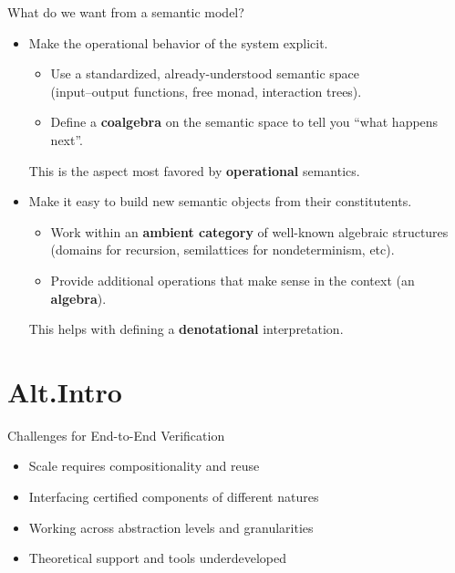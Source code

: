 \documentclass[aspectratio=1610,mathserif]{beamer}
\begin{document}
\begin{frame}{What do we want from a semantic model?} %
  \begin{itemize}
    \item Make the operational behavior of the system explicit.
      \begin{itemize}
        \item Use a standardized, already-understood semantic space \\
          (input--output functions, free monad, interaction trees).
        \item Define a \textbf{coalgebra} on the semantic space
           to tell you ``what happens next''.
      \end{itemize}
      This is the aspect most favored by \textbf{operational} semantics.
    \pause
    \vspace{1ex}
    \item Make it easy to build new semantic objects from their constitutents.
      \begin{itemize}
        \item Work within an \textbf{ambient category} of well-known algebraic structures \\
          (domains for recursion,
           semilattices for nondeterminism, etc).
        \item Provide additional operations that make sense in the context
          (an \textbf{algebra}).
      \end{itemize}
      This helps with defining a \textbf{denotational} interpretation.
  \end{itemize}
\end{frame}


\section{Alt.\@ Intro} %
\frame\sectionpage

\begin{frame}{Challenges for End-to-End Verification}
  \begin{itemize}
    \item Scale requires compositionality and reuse
    \item Interfacing certified components of different natures
    \item Working across abstraction levels and granularities
    \item Theoretical support and tools underdeveloped
  \end{itemize}
\end{frame}
\end{document}
